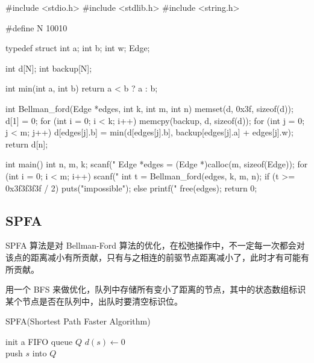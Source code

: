 \begin{mycpptwocol}
    #include <stdio.h>
    #include <stdlib.h>
    #include <string.h>

    #define N 10010

    typedef struct {
        int a;
        int b;
        int w;
    } Edge;

    int d[N];
    int backup[N];

    int min(int a, int b) {
        return a < b ? a : b;
    }

    int Bellman_ford(Edge *edges, int k, int m, int n) {
        memset(d, 0x3f, sizeof(d));
        d[1] = 0;
        for (int i = 0; i < k; i++) {
            memcpy(backup, d, sizeof(d));
            for (int j = 0; j < m; j++) {
                d[edges[j].b] = min(d[edges[j].b], backup[edges[j].a] + edges[j].w);
            }
        }
        return d[n];
    }

    int main() {
        int n, m, k;
        scanf("%
        Edge *edges = (Edge *)calloc(m, sizeof(Edge));
        for (int i = 0; i < m; i++) {
            scanf("%
        }
        int t = Bellman_ford(edges, k, m, n);
        if (t >= 0x3f3f3f3f / 2) {
            puts("impossible");
        } else {
            printf("%
        }
        free(edges);
        return 0;
    }
\end{mycpptwocol}

\subsection{SPFA}
SPFA 算法是对 Bellman-Ford 算法的优化，在松弛操作中，不一定每一次都会对该点的距离减小有所贡献，只有与之相连的前驱节点距离减小了，此时才有可能有所贡献。

用一个 BFS 来做优化，队列中存储所有变小了距离的节点，其中的状态数组标识某个节点是否在队列中，出队时要清空标识位。

\begin{algorithm}[H] %
    \caption{SPFA(Shortest Path Faster Algorithm)}
    \SetAlgoLined
    init a FIFO queue $Q$\;
    $d(s) \leftarrow 0$\\
    push $s$ into $Q$\\
\end{algorithm}

